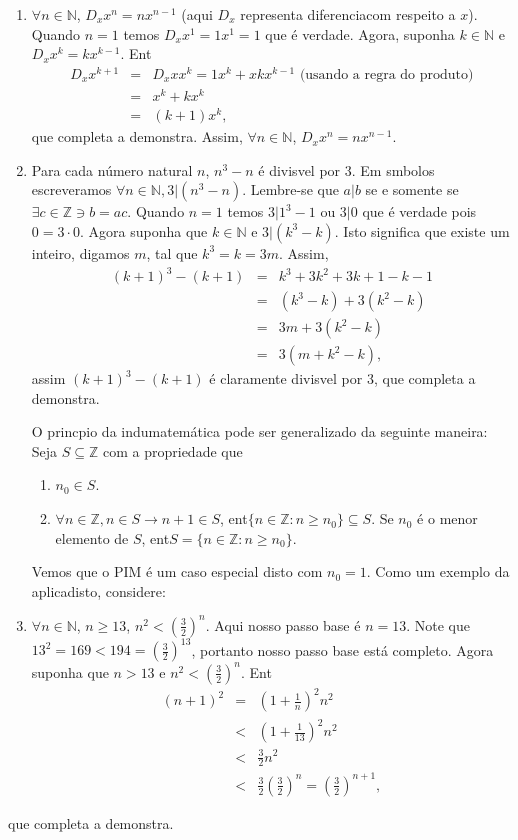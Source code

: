 \begin{enumerate}[{\bf 1.}]
\item $\forall n\in\mathbb{N}$, $D_x x^n=nx^{n-1}$ (aqui $D_x$ representa diferencia\cao com respeito a $x$). Quando $n=1$ temos $D_x x^1=1x^{1}=1$ que \'e verdade. Agora, suponha $k\in\mathbb{N}$ e $D_x x^k=kx^{k-1}$. Ent\ao
\begin{eqnarray*}
D_x x^{k+1}&=& D_x x x^{k} = 1x^{k}+xkx^{k-1} \textrm{ (usando a regra do produto)}\\
           &=& x^{k}+kx^{k}\\
           &=& (k+1)x^{k},
\end{eqnarray*}  
que completa a demonstra\caoi. Assim, $\forall n\in\mathbb{N}$, $D_x x^n=nx^{n-1}$.

\item Para cada n\'umero natural $n$, $n^3-n$ \'e divis\ih vel por $3$. Em s\ih mbolos escrever\ih amos $\forall n\in\mathbb{N}, 3|(n^3-n)$. Lembre-se que $a|b$ se e somente se $\exists c\in\mathbb{Z}\ni b=ac$. Quando $n=1$ temos $3|1^3-1$ ou $3|0$ que \'e verdade pois $0=3\cdot 0$. Agora suponha que $k\in\mathbb{N}$ e $3|(k^3-k)$. Isto significa que existe um inteiro, digamos $m$, tal que $k^3=k=3m$. Assim,
\begin{eqnarray*}
(k+1)^3-(k+1)&=& k^3+3k^2+3k+1-k-1\\
&=& (k^3-k)+3(k^2-k)\\
&=& 3m+3(k^2-k)\\
&=& 3(m+k^2-k),
\end{eqnarray*}
assim $(k+1)^3-(k+1)$ \'e claramente divis\ih vel por $3$, que completa a demonstra\caoi.

O princ\ih pio da indu\cao matem\'atica pode ser generalizado da seguinte maneira: Seja $S\subseteq\mathbb{Z}$ com a propriedade que
\begin{enumerate}[{\bf a)}]
\item $n_0\in S$.
\item $\forall n\in \mathbb{Z}, n\in S \rightarrow n+1\in S$, ent\ao $\{n\in\mathbb{Z}:n\geq n_0\}\subseteq S$. Se $n_0$ \'e o menor elemento de $S$, ent\ao $S=\{n\in\mathbb{Z}:n\geq n_0\}$. 
\end{enumerate}

Vemos que o PIM \'e um caso especial disto com $n_0=1$. Como um exemplo da aplica\cao disto, considere:

\item $\forall n\in\mathbb{N}$, $n\geq 13$, $n^2<(\frac{3}{2})^n$. Aqui nosso passo base \'e $n=13$. Note que $13^2=169<194=(\frac{3}{2})^{13}$, portanto nosso passo base est\'a completo. Agora suponha que $n>13$ e $n^2<(\frac{3}{2})^n$. Ent\ao
\begin{eqnarray*}
(n+1)^2&=& \left(1+\frac{1}{n}\right)^2n^2\\
&<& \left(1+\frac{1}{13}\right)^2n^2\\
&<& \frac{3}{2}n^2\\
&<& \frac{3}{2}\left(\frac{3}{2}\right)^n=\left(\frac{3}{2}\right)^{n+1},
\end{eqnarray*}
\end{enumerate}
que completa a demonstra\caoi.

